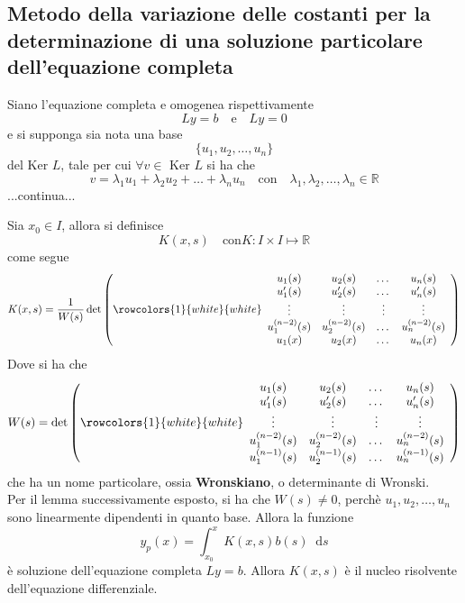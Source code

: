 \documentclass[a4paper]{extarticle}
\newcommand*\dif{\mathop{}\!\mathrm{d}}
\begin{document}
\vspace{1em}
\noindent
\subsection{Metodo della variazione delle costanti per la determinazione di una soluzione particolare dell'equazione completa}
Siano l'equazione completa e omogenea rispettivamente
\[L y = b \hspace{1em} \text{e} \hspace{1em} L y =0\]
e si supponga sia nota una base
\[\{u_1,u_2,\dots,u_n\}\]
del Ker $L$, tale per cui $\forall v \in \text{ Ker } L$ si ha che
\[v = \lambda_1 u_1 + \lambda_2 u_2 + \dots + \lambda_n u_n \hspace{1em} \text{con} \hspace{1em} \lambda_1,\lambda_2,\dots,\lambda_n \in \mathbb{R}\]
...continua...

\vspace{2em}
\noindent
Sia $x_0 \in I$, allora si definisce
\[K(x,s) \hspace{1em} \text{con} K : I \times I \longmapsto \mathbb{R}\]
come segue
\[K(x,s) = \dfrac{1}{W(s)} \det \left(
    \rowcolors{1}{white}{white}
    \begin{array}{cccc}
        u_1(s) & u_2(s) & \dots & u_n(s)\\
        u_1'(s) & u_2'(s) & \dots & u_n'(s)\\
        \vdots & \vdots & \vdots & \vdots\\
        u_1^{(n-2)}(s) & u_2^{(n-2)}(s) & \dots & u_n^{(n-2)}(s)\\
        u_1(x) & u_2(x) & \dots & u_n(x)\\
    \end{array}
\right)\]
Dove si ha che
\[{W(s)} = \det \left(
    \rowcolors{1}{white}{white}
    \begin{array}{cccc}
        u_1(s) & u_2(s) & \dots & u_n(s)\\
        u_1'(s) & u_2'(s) & \dots & u_n'(s)\\
        \vdots & \vdots & \vdots & \vdots\\
        u_1^{(n-2)}(s) & u_2^{(n-2)}(s) & \dots & u_n^{(n-2)}(s)\\
        u_1^{(n-1)}(s) & u_2^{(n-1)}(s) & \dots & u_n^{(n-1)}(s)\\
    \end{array}
\right)\]
che ha un nome particolare, ossia \textbf{Wronskiano}, o determinante di Wronski.\\
Per il lemma successivamente esposto, si ha che $W(s) \neq 0$, perchè $u_1,u_2,\dots,u_n$ sono linearmente dipendenti in quanto base. Allora la funzione
\[y_p(x) = \int_{x_0}^x K(x,s) b(s) \dif s\]
è soluzione dell'equazione completa $Ly = b$. Allora $K(x,s)$ è il nucleo risolvente dell'equazione differenziale.
\end{document}
